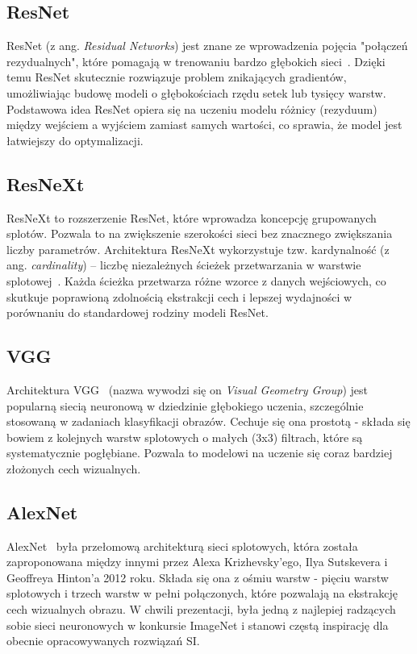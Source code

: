 \subsection{ResNet}

ResNet (z ang. \textit{Residual Networks}) jest znane ze wprowadzenia pojęcia "połączeń rezydualnych", które pomagają w trenowaniu bardzo głębokich sieci~\cite{resnet}.
Dzięki temu ResNet skutecznie rozwiązuje problem znikających gradientów, umożliwiając budowę modeli o głębokościach rzędu setek lub tysięcy warstw.
Podstawowa idea ResNet opiera się na uczeniu modelu różnicy (rezyduum) między wejściem a wyjściem zamiast samych wartości, co sprawia, że model jest łatwiejszy do optymalizacji.

\subsection{ResNeXt}

ResNeXt to rozszerzenie ResNet, które wprowadza koncepcję grupowanych splotów.
Pozwala to na zwiększenie szerokości sieci bez znacznego zwiększania liczby parametrów.
Architektura ResNeXt wykorzystuje tzw.
kardynalność (z ang. \textit{cardinality}) – liczbę niezależnych ścieżek przetwarzania w warstwie splotowej~\cite{cardinality}.
Każda ścieżka przetwarza różne wzorce z danych wejściowych, co skutkuje poprawioną zdolnością ekstrakcji cech i lepszej wydajności w porównaniu do standardowej rodziny modeli ResNet.

\subsection{VGG}

Architektura VGG~\cite{vgg} (nazwa wywodzi się on \textit{Visual Geometry Group}) jest popularną siecią neuronową w dziedzinie głębokiego uczenia, szczególnie stosowaną w zadaniach klasyfikacji obrazów. Cechuje się ona prostotą - składa się bowiem z kolejnych warstw splotowych o małych (3x3) filtrach, które są systematycznie pogłębiane. Pozwala to modelowi na uczenie się coraz bardziej złożonych cech wizualnych.

\subsection{AlexNet}

AlexNet~\cite{alexnet} była przełomową architekturą sieci splotowych, która została zaproponowana między innymi przez Alexa Krizhevsky'ego, Ilya Sutskevera i Geoffreya Hinton'a  2012 roku. Składa się ona z ośmiu warstw - pięciu warstw splotowych i trzech warstw w pełni połączonych, które pozwalają na ekstrakcję cech wizualnych obrazu. W chwili prezentacji, była jedną z najlepiej radzących sobie sieci neuronowych w konkursie ImageNet i stanowi częstą inspirację dla obecnie opracowywanych rozwiązań SI.